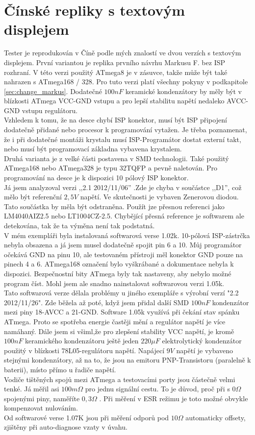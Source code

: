 \section{Čínské repliky s textovým displejem}
Tester je reprodukován v Číně podle mých znalostí ve dvou verzích s textovým displejem.
První variantou je replika prvního návrhu Markusu F. bez ISP rozhraní.
V této verzi použitý ATmega8 je  v zásuvce, takže může být také nahrazen s ATmega168 / 328.
Pro tuto verzi platí všechny pokyny v podkapitole \ref{sec:change_markus}.
Dodatečné \(100nF\) keramické kondenzátory by měly být v blízkosti ATmega VCC-GND vstupu a
pro lepší stabilitu napětí nedaleko AVCC-GND vstupu regulátoru.\\
Vzhledem k tomu, že na desce chybí ISP konektor, musí být ISP připojení dodatečně přidané nebo
procesor k programování vytažen.
Je třeba poznamenat, že i při dodatečné montáži krystalu musí ISP-Programátor dostat externí takt,
nebo musí být programovací základna vybavena krystalem.\\
Druhá varianta je z velké části postavena v SMD technologii. Také použitý ATmega168 nebo ATmega328
je typu 32TQFP a pevně naletován.
Pro programování na desce je k dispozici 10 pólový ISP konektor.\\
Já  jsem analyzoval verzi ,,2.1 2012/11/06'' .Zde je chyba v součástce ,,D1'',
což mělo být referenční \(2,5V\) napětí. Ve skutečnosti je vybaven Zenerovou diodou.
Tato součástka by měla být odstraněna. Použít jze přesnou referenci jako LM4040AIZ2.5 nebo
LT1004CZ-2.5. Chybějící přesná reference je softwarem ale detekována, tak že ta výměna
není tak podstatná.\\
V mém exempláři byla instalovaná softwarová verse 1.02k. 10-pólová ISP-zástrčka nebyla obsazena
a já jsem  musel dodatečně spojit pin 6 a 10. Můj programátor očekává GND na pinu 10, ale
testovaném přístroji měl konektor GND pouze na pinech 4 a 6.
ATmega168 označení bylo vyškrábané a dokumentace nebyla k dispozici.
Bezpečnostní bity ATmega byly tak nastaveny, aby nebylo možné program číst.
Mohl jsem ale snadno nainstalovat softwarovou verzi 1.05k.\\
Tato softwarová verze dělala problémy u jiného exempláře s výrobní verzí "2.2 2012/11/26".
Zde běžela až poté, když jsem přidal další SMD \(100nF\) kondenzátor mezi piny 18-AVCC
a 21-GND. Software 1.05k využívá při čekání stav spánku ATmega.
Proto se spotřeba energie častěji mění a regulátor napětí je více namáhaný.
Dále jsem si všiml,že pro zlepšení stability VCC napětí, je kromě \(100nF\) keramického kondenzátoru
ještě jeden \(220\mu F\) elektrolytický kondenzátor použitý v blízkosti 78L05-regulátoru napětí.
Napájecí \(9V\) napětí je vybaveno stejnými kondenzátory, až na to, že jsou na emitoru PNP-Transistoru
(paralelně k baterii), místo přímo u řadiče napětí.\\
Vodiče tištěných spojů mezi ATmega a testovacími porty jsou částečně velmi tenké. Já měřil asi \(100m\Omega\)
pro jednu signální cestu. To je důvod, proč při s \(0\Omega\) spojenými piny, naměříte \(0,3\Omega\) .
Při měření v ESR režimu je toto možné obvykle kompenzovat nulováním.\\
Od softwarové verse 1.07K jsou při měření odporů pod \(10\Omega\) automaticky offsety, zjištěny při
auto-diagnose vzaty v úvahu.

